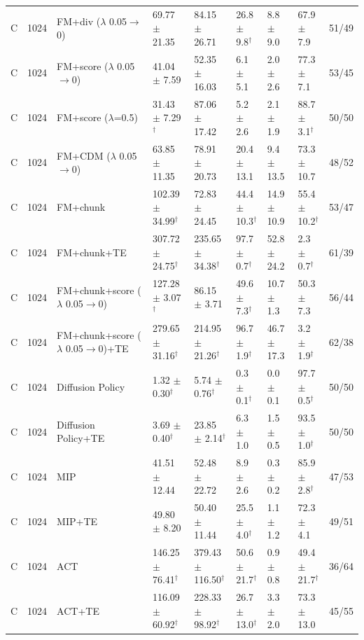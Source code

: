 \begin{tabular}{lllllllll}
C & 1024 & FM+div ($\lambda$ 0.05$\to$0) & 69.77 $\pm$ 21.35 & 84.15 $\pm$ 26.71 & 26.8 $\pm$ 9.8$^\dagger$ & 8.8 $\pm$ 9.0 & 67.9 $\pm$ 7.9 & 51/49 \\
C & 1024 & FM+score ($\lambda$ 0.05$\to$0) & 41.04 $\pm$ 7.59 & 52.35 $\pm$ 16.03 & 6.1 $\pm$ 5.1 & 2.0 $\pm$ 2.6 & 77.3 $\pm$ 7.1 & 53/45 \\
C & 1024 & FM+score ($\lambda$=0.5) & 31.43 $\pm$ 7.29$^\dagger$ & 87.06 $\pm$ 17.42 & 5.2 $\pm$ 2.6 & 2.1 $\pm$ 1.9 & 88.7 $\pm$ 3.1$^\dagger$ & 50/50 \\
C & 1024 & FM+CDM ($\lambda$ 0.05$\to$0) & 63.85 $\pm$ 11.35 & 78.91 $\pm$ 20.73 & 20.4 $\pm$ 13.1 & 9.4 $\pm$ 13.5 & 73.3 $\pm$ 10.7 & 48/52 \\
C & 1024 & FM+chunk & 102.39 $\pm$ 34.99$^\dagger$ & 72.83 $\pm$ 24.45 & 44.4 $\pm$ 10.3$^\dagger$ & 14.9 $\pm$ 10.9 & 55.4 $\pm$ 10.2$^\dagger$ & 53/47 \\
C & 1024 & FM+chunk+TE & 307.72 $\pm$ 24.75$^\dagger$ & 235.65 $\pm$ 34.38$^\dagger$ & 97.7 $\pm$ 0.7$^\dagger$ & 52.8 $\pm$ 24.2 & 2.3 $\pm$ 0.7$^\dagger$ & 61/39 \\
C & 1024 & FM+chunk+score ($\lambda$ 0.05$\to$0) & 127.28 $\pm$ 3.07$^\dagger$ & 86.15 $\pm$ 3.71 & 49.6 $\pm$ 7.3$^\dagger$ & 10.7 $\pm$ 1.3 & 50.3 $\pm$ 7.3 & 56/44 \\
C & 1024 & FM+chunk+score ($\lambda$ 0.05$\to$0)+TE & 279.65 $\pm$ 31.16$^\dagger$ & 214.95 $\pm$ 21.26$^\dagger$ & 96.7 $\pm$ 1.9$^\dagger$ & 46.7 $\pm$ 17.3 & 3.2 $\pm$ 1.9$^\dagger$ & 62/38 \\
C & 1024 & Diffusion Policy & 1.32 $\pm$ 0.30$^\dagger$ & 5.74 $\pm$ 0.76$^\dagger$ & 0.3 $\pm$ 0.1$^\dagger$ & 0.0 $\pm$ 0.1 & 97.7 $\pm$ 0.5$^\dagger$ & 50/50 \\
C & 1024 & Diffusion Policy+TE & 3.69 $\pm$ 0.40$^\dagger$ & 23.85 $\pm$ 2.14$^\dagger$ & 6.3 $\pm$ 1.0 & 1.5 $\pm$ 0.5 & 93.5 $\pm$ 1.0$^\dagger$ & 50/50 \\
C & 1024 & MIP & 41.51 $\pm$ 12.44 & 52.48 $\pm$ 22.72 & 8.9 $\pm$ 2.6 & 0.3 $\pm$ 0.2 & 85.9 $\pm$ 2.8$^\dagger$ & 47/53 \\
C & 1024 & MIP+TE & 49.80 $\pm$ 8.20 & 50.40 $\pm$ 11.44 & 25.5 $\pm$ 4.0$^\dagger$ & 1.1 $\pm$ 1.2 & 72.3 $\pm$ 4.1 & 49/51 \\
C & 1024 & ACT & 146.25 $\pm$ 76.41$^\dagger$ & 379.43 $\pm$ 116.50$^\dagger$ & 50.6 $\pm$ 21.7$^\dagger$ & 0.9 $\pm$ 0.8 & 49.4 $\pm$ 21.7$^\dagger$ & 36/64 \\
C & 1024 & ACT+TE & 116.09 $\pm$ 60.92$^\dagger$ & 228.33 $\pm$ 98.92$^\dagger$ & 26.7 $\pm$ 13.0$^\dagger$ & 3.3 $\pm$ 2.0 & 73.3 $\pm$ 13.0 & 45/55 \\

\end{tabular}
